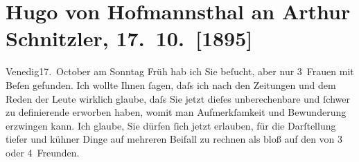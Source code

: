 

         
         \renewcommand{\erwaehntePersonen}{Personen: Richard Beer-Hofmann, Alfred von Berger,  Der Reporter, Hugo von Hofmannsthal, Karl Kraus}
         \renewcommand{\erwaehnteOrte}{Orte: Venedig, Wien}
         \renewcommand{\erwaehnteWerke}{Werke: Burgtheater [Rechte der Seele, Liebelei], Extrapost. Unparteiische Montags-Zeitung, Jung-Wiener Dichter. (Zur Burgtheater-Première.), Liebelei. Schauspiel in drei Akten}
               \section[Hugo von Hofmannsthal an Arthur Schnitzler, 17. 10. {[}1895{]}]{ Hugo von Hofmannsthal an Arthur Schnitzler, 17. 10. {[}1895{]}}\nopagebreak{}\rehead{ }\begin{ledgroupsized}[t]{13cm}\normalsize\beginnumbering \toendnotes[C]{\smallbreak\pagebreak[2]} 
\toendnotes[C]{\smallbreak}\pstart
           \raggedleft{}{\pb}Venedig17. October\pend
           \pstart
           am Sonntag{ }Früh hab ich Sie beſucht, aber nur 3 Frauen mit Beſen gefunden. Ich
               wollte Ihnen ſagen, daſs ich nach den Zeitungen und dem Reden der Leute wirklich
               glaube, daſs Sie jetzt dieſes unberechenbare und ſchwer zu definierende erworben
               haben, womit man Aufmerkſamkeit und Bewunderung erzwingen kann. Ich glaube, Sie
               dürfen ſich jetzt erlauben, für die Darſtellung {\pb}tiefer und kühner Dinge auf
               mehreren Beifall zu rechnen als bloß auf den von 3 oder 4 Freunden.\pend
           \pstart

\end{ledgroupsized}
